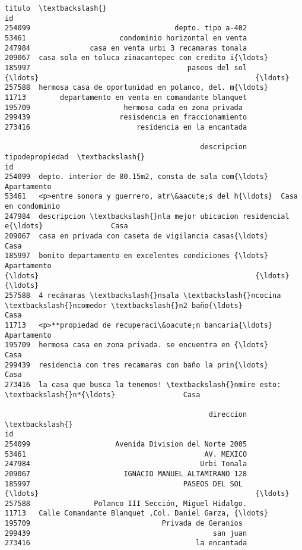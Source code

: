\documentclass[11pt]{article}
\newcommand{\prompt}[4]{
        \llap{{\color{#2}[#3]: #4}}\vspace{-1.25em}
    }
\begin{document}
            \begin{tcolorbox}[breakable, boxrule=.5pt, size=fbox, pad at break*=1mm, opacityfill=0]
\prompt{Out}{outcolor}{499}{\hspace{3.5pt}}
\begin{Verbatim}[commandchars=\\\{\}]
                                                   titulo  \textbackslash{}
id
254099                                  depto. tipo a-402
53461                      condominio horizontal en venta
247984              casa en venta urbi 3 recamaras tonala
209067  casa sola en toluca zinacantepec con credito i{\ldots}
185997                                     paseos del sol
{\ldots}                                                   {\ldots}
257588  hermosa casa de oportunidad en polanco, del. m{\ldots}
11713        departamento en venta en comandante blanquet
195709                      hermosa cada en zona privada
299439                     resisdencia en fraccionamiento
273416                         residencia en la encantada

                                              descripcion     tipodepropiedad  \textbackslash{}
id
254099  depto. interior de 80.15m2, consta de sala com{\ldots}         Apartamento
53461   <p>entre sonora y guerrero, atr\&aacute;s del h{\ldots}  Casa en condominio
247984  descripcion \textbackslash{}nla mejor ubicacion residencial e{\ldots}                Casa
209067  casa en privada con caseta de vigilancia casas{\ldots}                Casa
185997  bonito departamento en excelentes condiciones {\ldots}         Apartamento
{\ldots}                                                   {\ldots}                 {\ldots}
257588  4 recámaras \textbackslash{}nsala \textbackslash{}ncocina \textbackslash{}ncomedor \textbackslash{}n2 baño{\ldots}                Casa
11713   <p>**propiedad de recuperaci\&oacute;n bancaria{\ldots}         Apartamento
195709  hermosa casa en zona privada. se encuentra en {\ldots}                Casa
299439  residencia con tres recamaras con baño la prin{\ldots}                Casa
273416  la casa que busca la tenemos! \textbackslash{}nmire esto: \textbackslash{}n*{\ldots}                Casa

                                                direccion  \textbackslash{}
id
254099                    Avenida Division del Norte 2005
53461                                          AV. MEXICO
247984                                        Urbi Tonala
209067                      IGNACIO MANUEL ALTAMIRANO 128
185997                                    PASEOS DEL SOL
{\ldots}                                                   {\ldots}
257588               Polanco III Sección, Miguel Hidalgo.
11713   Calle Comandante Blanquet ,Col. Daniel Garza, {\ldots}
195709                               Privada de Geranios
299439                                           san juan
273416                                       la encantada


\end{Verbatim}
\end{tcolorbox}
\end{document}
